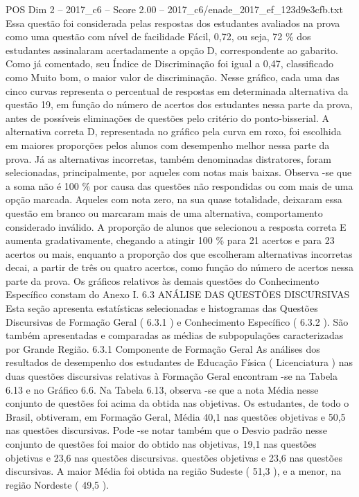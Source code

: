 \begin{textsample}{POS Dim 2 – 2017\_c6 – Score 2.00 – 2017\_c6/enade\_2017\_ef\_123d9e3cfb.txt}
Essa questão foi considerada pelas respostas dos estudantes avaliados na prova como uma questão com nível de facilidade Fácil, 0,72, ou seja, 72 \% dos estudantes assinalaram acertadamente a opção D, correspondente ao gabarito.
Como já comentado, seu Índice de Discriminação foi igual a 0,47, classificado como Muito bom, o maior valor de discriminação.
Nesse gráfico, cada uma das cinco curvas representa o percentual de respostas em determinada alternativa da questão 19, em função do número de acertos dos estudantes nessa parte da prova, antes de possíveis eliminações de questões pelo critério do ponto-bisserial.
A alternativa correta D, representada no gráfico pela curva em roxo, foi escolhida em maiores proporções pelos alunos com desempenho melhor nessa parte da prova.
Já as alternativas incorretas, também denominadas distratores, foram selecionadas, principalmente, por aqueles com notas mais baixas.
Observa -se que a soma não é 100 \% por causa das questões não respondidas ou com mais de uma opção marcada.
Aqueles com nota zero, na sua quase totalidade, deixaram essa questão em branco ou marcaram mais de uma alternativa, comportamento considerado inválido.
A proporção de alunos que selecionou a resposta correta E aumenta gradativamente, chegando a atingir 100 \% para 21 acertos e para 23 acertos ou mais, enquanto a proporção dos que escolheram alternativas incorretas decai, a partir de três ou quatro acertos, como função do número de acertos nessa parte da prova.
Os gráficos relativos às demais questões do Conhecimento Específico constam do Anexo I. 6.3 ANÁLISE DAS QUESTÕES DISCURSIVAS Esta seção apresenta estatísticas selecionadas e histogramas das Questões Discursivas de Formação Geral ( 6.3.1 ) e Conhecimento Específico ( 6.3.2 ).
São também apresentadas e comparadas as médias de subpopulações caracterizadas por Grande Região. 6.3.1 Componente de Formação Geral As análises dos resultados de desempenho dos estudantes de Educação Física ( Licenciatura ) nas duas questões discursivas relativas à Formação Geral encontram -se na Tabela 6.13 e no Gráfico 6.6.
Na Tabela 6.13, observa -se que a nota Média nesse conjunto de questões foi acima da obtida nas objetivas.
Os estudantes, de todo o Brasil, obtiveram, em Formação Geral, Média 40,1 nas questões objetivas e 50,5 nas questões discursivas.
Pode -se notar também que o Desvio padrão nesse conjunto de questões foi maior do obtido nas objetivas, 19,1 nas questões objetivas e 23,6 nas questões discursivas. questões objetivas e 23,6 nas questões discursivas.
A maior Média foi obtida na região Sudeste ( 51,3 ), e a menor, na região Nordeste ( 49,5 ).

\end{textsample}
